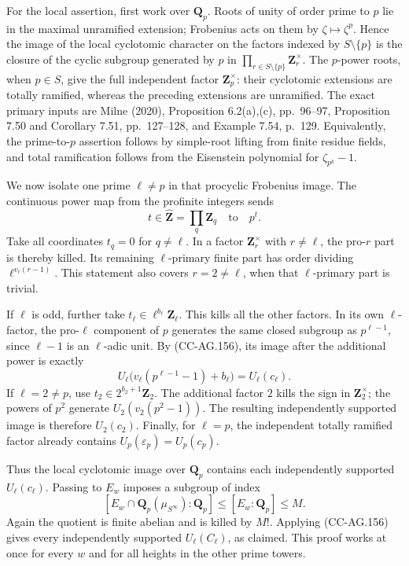 For the local assertion, first work over \(\mathbf Q_p\). Roots of unity
of order prime to \(p\) lie in the maximal unramified extension;
Frobenius acts on them by \(\zeta\mapsto\zeta^p\). Hence the image of
the local cyclotomic character on the factors indexed by
\(S\setminus\{p\}\) is the closure of the cyclic subgroup generated by
\(p\) in \(\prod_{r\in S\setminus\{p\}}\mathbf Z_r^\times\). The
\(p\)-power roots, when \(p\in S\), give the full independent factor
\(\mathbf Z_p^\times\): their cyclotomic extensions are totally
ramified, whereas the preceding extensions are unramified. The exact
primary inputs are Milne (2020), Proposition 6.2(a),(c), pp.~96--97,
Proposition 7.50 and Corollary 7.51, pp.~127--128, and Example 7.54,
p.~129. Equivalently, the prime-to-\(p\) assertion follows by
simple-root lifting from finite residue fields, and total ramification
follows from the Eisenstein polynomial for \(\zeta_{p^k}-1\).

We now isolate one prime \(\ell\ne p\) in that procyclic Frobenius
image. The continuous power map from the profinite integers sends \[
 t\in\widehat{\mathbf Z}=\prod_q\mathbf Z_q
          \quad\text{to}\quad p^t.
\] Take all coordinates \(t_q=0\) for \(q\ne\ell\). In a factor
\(\mathbf Z_r^\times\) with \(r\ne\ell\), the pro-\(r\) part is thereby
killed. Its remaining \(\ell\)-primary finite part has order dividing
\(\ell^{v_\ell(r-1)}\). This statement also covers \(r=2\ne\ell\), when
that \(\ell\)-primary part is trivial.

If \(\ell\) is odd, further take
\(t_\ell\in\ell^{b_\ell}\mathbf Z_\ell\). This kills all the other
factors. In its own \(\ell\)-factor, the pro-\(\ell\) component of \(p\)
generates the same closed subgroup as \(p^{\ell-1}\), since \(\ell-1\)
is an \(\ell\)-adic unit. By (CC-AG.156), its image after the additional
power is exactly \[
 U_\ell\bigl(v_\ell(p^{\ell-1}-1)+b_\ell\bigr)=U_\ell(c_\ell).
\] If \(\ell=2\ne p\), use \(t_2\in2^{b_2+1}\mathbf Z_2\). The
additional factor \(2\) kills the sign in \(\mathbf Z_2^\times\); the
powers of \(p^2\) generate \(U_2(v_2(p^2-1))\). The resulting
independently supported image is therefore \(U_2(c_2)\). Finally, for
\(\ell=p\), the independent totally ramified factor already contains
\(U_p(\varepsilon_p)=U_p(c_p)\).

Thus the local cyclotomic image over \(\mathbf Q_p\) contains each
independently supported \(U_\ell(c_\ell)\). Passing to \(E_w\) imposes a
subgroup of index \[
 [E_w\cap\mathbf Q_p(\mu_{S^\infty}):\mathbf Q_p]
       \le [E_w:\mathbf Q_p]\le M.
\] Again the quotient is finite abelian and is killed by \(M!\).
Applying (CC-AG.156) gives every independently supported
\(U_\ell(C_\ell)\), as claimed. This proof works at once for every \(w\)
and for all heights in the other prime towers.

